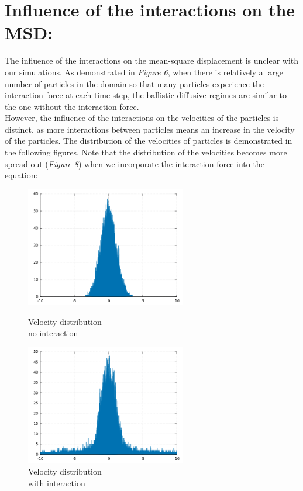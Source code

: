 \documentclass[a4paper,11pt]{article}
\begin{document}
\section*{Influence of the interactions on the MSD:}
The influence of the interactions on the mean-square displacement is unclear with our simulations. As demonstrated in \emph{Figure 6}, when there is relatively a large number of particles in the domain so that many particles experience the interaction force at each time-step, the ballistic-diffusive regimes are similar to the one without the interaction force. \\
However, the influence of the interactions on the velocities of the particles is distinct, as more interactions between particles means an increase in the velocity of the particles. The distribution of the velocities of particles is demonstrated in the following figures. Note that the distribution of the velocities becomes more spread out (\emph{Figure 8}) when we incorporate the interaction force into the equation:

\begin{figure}[!htb]
    \centering
    \begin{minipage}{.5\textwidth}
      \centering
      \includegraphics[width=7cm, height=5.25cm]{vel_non_inter.png}
      \caption{\small Velocity distribution \\ no interaction}
    \end{minipage}%
    \begin{minipage}{.5\textwidth}
      \centering
      \includegraphics[width=7cm, height=5.25cm]{vel_inter.png}
      \caption{\small Velocity distribution \\ with interaction}
    \end{minipage}
\end{figure}
\end{document}
